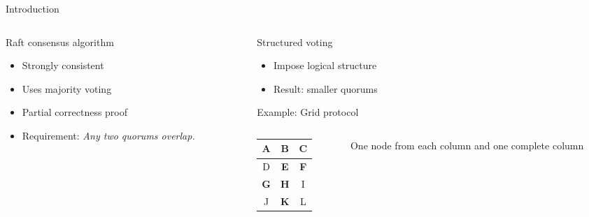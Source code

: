 \documentclass{beamer}
\newcommand{\voted}[1]{\textbf{\usebeamercolor[fg]{frametitle}#1}}
\begin{document}
\begin{frame}{Introduction}
    \begin{columns}[t]
        \begin{column}{.5\textwidth}
            \begin{block}{Raft consensus algorithm}
                \begin{itemize}
                    \item Strongly consistent
                    \item Uses majority voting
                    \item Partial correctness proof
                    \item Requirement: \emph{Any two quorums overlap.}
                \end{itemize}
            \end{block}
        \end{column}
        \begin{column}{.5\textwidth}
            \begin{block}{Structured voting}
                \begin{itemize}
                    \item Impose logical structure
                    \item Result: smaller quorums
                \end{itemize}

                \begin{exampleblock}{Example: Grid protocol}
                    \medskip
                    \begin{columns}
                        \begin{column}{.2\textwidth}
                            \begin{tabular}{c | c | c}
                                A & \voted{B} & C \\
                                \hline
                                D & \voted{E} & \voted{F} \\
                                \hline
                                \voted{G} & \voted{H} & I \\
                                \hline
                                J & \voted{K} & L \\
                            \end{tabular}
                        \end{column}
                        \begin{column}{.40\textwidth}
                            \small{One node from each column and one complete column}
                        \end{column}
                    \end{columns}
                \end{exampleblock}
            \end{block}
        \end{column}
    \end{columns}
\end{frame}
\end{document}
